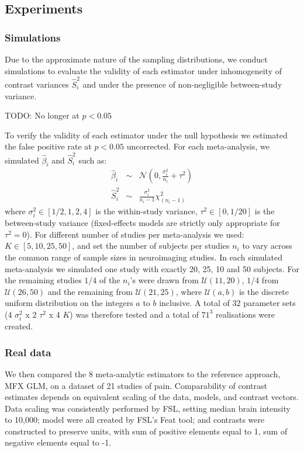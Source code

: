 \documentclass[preprint]{elsarticle}
\newcommand{\effectvector}{\hat\beta}
\newcommand{\effect}[1][i]{\effectvector_{#1}}
\newcommand{\vareffect}[1][i]{\hat S^2_{#1}}
\newcommand{\nStudies}{K}
\newcommand{\varBetween}{\tau^2}
\newcommand{\sampleSize}[1][i]{n_{#1}}
\newcommand{\varWithin}[1][i]{\sigma^2_{#1}}
\begin{document}
\subsection{Experiments}

\subsubsection{Simulations}
Due to the approximate nature of the sampling distributions, we conduct simulations to evaluate the validity of each estimator under inhomogeneity of contrast variances $\vareffect$ and under the presence of non-negligible between-study variance.


TODO: No longer at $p<0.05$

To verify the validity of each estimator under the null hypothesis we estimated the false positive rate at $p<0.05$ uncorrected. For each meta-analysis, we simulated $\effect$ and $\vareffect$ such as:
\begin{eqnarray}
	\effect &\sim& \mathcal{N}(0, \frac{\varWithin}{\sampleSize}+\varBetween) \\
	\vareffect &\sim& \frac{\varWithin}{\sampleSize-1} \chi^2_{(\sampleSize-1)}%
\end{eqnarray}
where $\varWithin \in [1/2, 1, 2, 4]$ is the within-study variance, $\varBetween \in [0, 1/20]$ is the between-study variance (fixed-effects models are strictly only appropriate for $\varBetween=0$). For different number of studies per meta-analysis we used: $\nStudies \in [5, 10, 25, 50]$, and set the number of subjects per studies $\sampleSize$ to vary across the common range of sample sizes in neuroimaging studies. In each simulated meta-analysis we simulated one study with exactly 20, 25, 10 and 50 subjects. For the remaining studies $1/4$ of the $\sampleSize$'s were drawn from $\mathcal{U}(11,20)$, $1/4$ from $\mathcal{U}(26,50)$ and the remaining from $\mathcal{U}(21,25)$, where $\mathcal{U}(a,b)$ is the discrete uniform distribution on the integers $a$ to $b$ inclusive. A total of 32 parameter sets (4 $\varWithin$ x 2 $\varBetween$ x 4 $\nStudies$) was therefore tested and a total of $71^3$ realisations were created.


\subsubsection{Real data}
We then compared the 8 meta-analytic estimators to the reference approach, MFX GLM, on a dataset of 21 studies of pain. 
Comparability of contrast estimates depends on equivalent scaling of the data, models, and contrast vectors. Data scaling was consistently performed by FSL, setting median brain intensity to 10,000; model were all created by FSL's Feat tool; and contrasts were constructed to preserve units, with sum of positive elements equal to 1, sum of negative elements equal to -1. 
\end{document}
